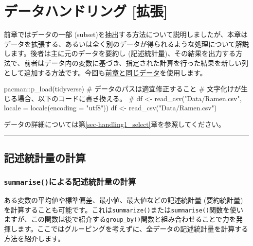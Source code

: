 \documentclass[
  a4paper,
  pandoc,
  ja=standard,
  jafont=haranoaji]{bxjsbook}
\newenvironment{Shaded}{\begin{snugshade}}{\end{snugshade}}
\newcommand{\CommentTok}[1]{\textcolor[rgb]{0.37,0.37,0.37}{#1}}
\newcommand{\FunctionTok}[1]{\textcolor[rgb]{0.28,0.35,0.67}{#1}}
\newcommand{\NormalTok}[1]{\textcolor[rgb]{0.00,0.48,0.65}{#1}}
\newcommand{\OtherTok}[1]{\textcolor[rgb]{0.00,0.48,0.65}{#1}}
\newcommand{\SpecialCharTok}[1]{\textcolor[rgb]{0.37,0.37,0.37}{#1}}
\newcommand{\StringTok}[1]{\textcolor[rgb]{0.13,0.47,0.30}{#1}}
\begin{document}
\hypertarget{sec-datahandling2}{%
\chapter{データハンドリング {[}拡張{]}}\label{sec-datahandling2}}

前章ではデータの一部
(subset)を抽出する方法について説明しましたが、本章はデータを拡張する、あるいは全く別のデータが得られるような処理について解説します。後者は主に元のデータを要約し
(記述統計量)、その結果を出力する方法で、前者はデータ内の変数に基づき、指定された計算を行った結果を新しい列として追加する方法です。今回も\href{Data/Ramen.csv}{前章と同じデータ}を使用します。

\begin{Shaded}
\begin{Highlighting}[numbers=left,,]
\NormalTok{pacman}\SpecialCharTok{::}\FunctionTok{p\_load}\NormalTok{(tidyverse)}
\CommentTok{\# データのパスは適宜修正すること}
\CommentTok{\# 文字化けが生じる場合、以下のコードに書き換える。}
\CommentTok{\# df \textless{}{-} read\_csv("Data/Ramen.csv", locale = locale(encoding = "utf8"))}
\NormalTok{df }\OtherTok{\textless{}{-}} \FunctionTok{read\_csv}\NormalTok{(}\StringTok{"Data/Ramen.csv"}\NormalTok{)}
\end{Highlighting}
\end{Shaded}

データの詳細については第\ref{sec-handling1_select}章を参照してください。

\begin{center}\rule{0.5\linewidth}{0.5pt}\end{center}

\hypertarget{sec-handling2_summarise}{%
\section{記述統計量の計算}\label{sec-handling2_summarise}}

\hypertarget{summariseux306bux3088ux308bux8a18ux8ff0ux7d71ux8a08ux91cfux306eux8a08ux7b97}{%
\subsection{\texorpdfstring{\texttt{summarise()}による記述統計量の計算}{summarise()による記述統計量の計算}}\label{summariseux306bux3088ux308bux8a18ux8ff0ux7d71ux8a08ux91cfux306eux8a08ux7b97}}

ある変数の平均値や標準偏差、最小値、最大値などの記述統計量
(要約統計量)を計算することも可能です。これは\texttt{summarize()}または\texttt{summarise()}関数を使いますが、この関数は後で紹介する\texttt{group\_by()}関数と組み合わせることで力を発揮します。ここではグルーピングを考えずに、全データの記述統計量を計算する方法を紹介します。
\end{document}
